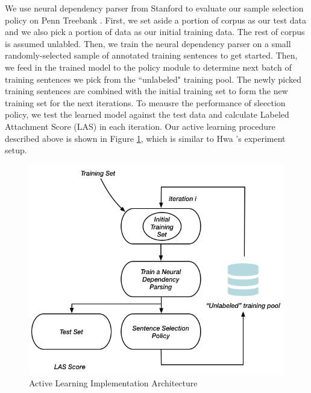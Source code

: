 \documentclass[11pt,letterpaper]{article}
\begin{document}
We use neural dependency parser from Stanford \cite{D14-1082} to evaluate our sample selection policy on Penn Treebank \cite{Marcus:1994}.
First, we set aside a portion of corpus as our test data and we also pick a portion of data as our initial training data. The rest of corpus
is assumed unlabled. Then, we train the neural dependency parser on a small randomly-selected sample of annotated training sentences to get started.
Then, we feed in the trained model to the policy module to determine next batch of training sentences we pick from the ``unlabeled" training pool.
The newly picked training sentences are combined with the initial training set to form the new training set for the next iterations. To meausre
the performance of sleection policy, we test the learned model against the test data and calculate Labeled Attachment Score (LAS) in each iteration.
Our active learning procedure described above is shown in Figure \ref{fig:2}, which is similar to Hwa 's 
experiment setup.

\begin{figure}
\centering
\includegraphics[width=\linewidth]{active-arch.png}
\caption{Active Learning Implementation Architecture}
\label{fig:2}
\end{figure}
\end{document}
